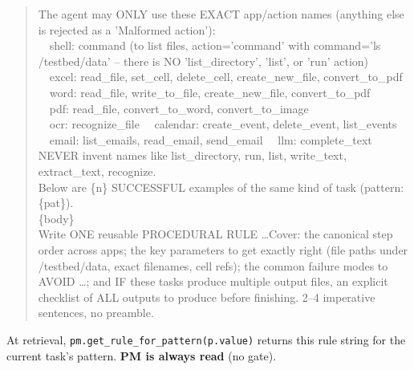 \begin{quote}\small\ttfamily
The agent may ONLY use these EXACT app/action names (anything else is rejected as a 'Malformed
action'):\\
\ \ shell: command (to list files, action='command' with command='ls /testbed/data' -- there is NO
'list\_directory', 'list', or 'run' action)\\
\ \ excel: read\_file, set\_cell, delete\_cell, create\_new\_file, convert\_to\_pdf\\
\ \ word: read\_file, write\_to\_file, create\_new\_file, convert\_to\_pdf\\
\ \ pdf: read\_file, convert\_to\_word, convert\_to\_image\\
\ \ ocr: recognize\_file \ \ calendar: create\_event, delete\_event, list\_events\\
\ \ email: list\_emails, read\_email, send\_email \ \ llm: complete\_text\\
NEVER invent names like list\_directory, run, list, write\_text, extract\_text, recognize.\\[2pt]
Below are \{n\} SUCCESSFUL examples of the same kind of task (pattern: \{pat\}).\\[2pt]
\{body\}\\[2pt]
Write ONE reusable PROCEDURAL RULE \dots Cover: the canonical step order across apps; the key
parameters to get exactly right (file paths under /testbed/data, exact filenames, cell refs); the
common failure modes to AVOID \dots; and IF these tasks produce multiple output files, an explicit
checklist of ALL outputs to produce before finishing. 2--4 imperative sentences, no preamble.
\end{quote}

\noindent At retrieval, \texttt{pm.get\_rule\_for\_pattern(p.value)} returns this rule string for the
current task's pattern. \textbf{PM is always read} (no gate).

